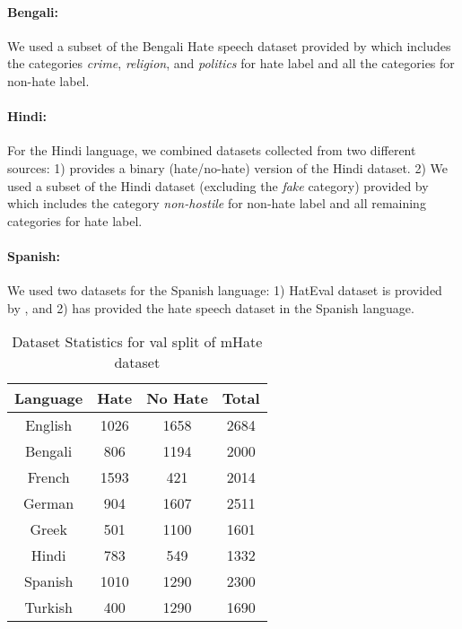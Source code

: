 \paragraph{Bengali:} We used a subset of the Bengali Hate speech dataset provided by \cite{romim2020hate} which includes the categories \textit{crime}, \textit{religion}, and \textit{politics} for hate label and all the categories for non-hate label.
\paragraph{Hindi:} For the Hindi language, we combined datasets collected from two different sources: 1) \cite{10.1145/3368567.3368584} provides a binary (hate/no-hate) version of the Hindi dataset. 2) We used a subset of the Hindi dataset (excluding the \textit{fake} category) provided by \cite{bhardwaj2020hostility} which includes the category \textit{non-hostile} for non-hate label and all remaining categories for hate label.

\paragraph{Spanish:}We used two datasets for the Spanish language: 1) HatEval dataset is provided by \cite{basile-etal-2019-semeval}, and 2) \cite{PereiraKohatsu2019DetectingAM} has provided the hate speech dataset in the Spanish language.


\begin{table}[tbhp]
    \centering
    \begin{tabular}{c|c|c|c}
        \toprule
        \textbf{Language}   & \textbf{Hate}  & \textbf{No Hate} & \textbf{Total} \\
        \midrule
        English    &  1026 & 1658 & 2684 \\
        Bengali    & 806  & 1194 & 2000 \\
        French     & 1593 & 421 & 2014\\
        German     & 904 & 1607 & 2511\\
        Greek      & 501 & 1100 & 1601\\
        Hindi      & 783  & 549 & 1332 \\
        Spanish    & 1010  & 1290 & 2300 \\
        Turkish    & 400 & 1290 & 1690 \\
       \bottomrule
    \end{tabular}
    \caption{Dataset Statistics for val split of mHate dataset}
    \label{tab:hate_dataset_used}
\end{table}


